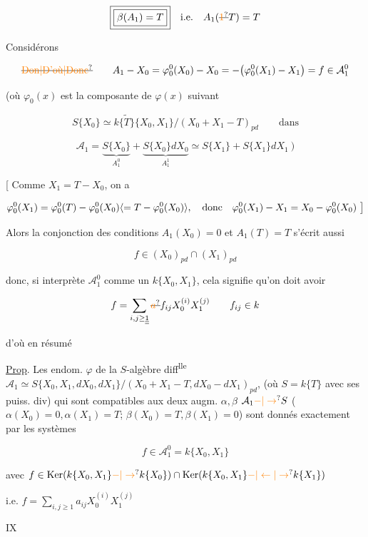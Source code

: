 
\[
\boxed{\boxed{\beta(A_1)=T}}\quad\text{i.e.}\quad A_1(\deleted{\unsure{1}}T)=T
\]

 Considérons

\[
\deleted{\text{\unsure{Don|D'où|Donc}}}\qquad A_1-X_0=\varphi_0^0(X_0)-X_0=-\bigl(\varphi_0^0(X_1)-X_1\bigr)=f\in\mathcal A_1^0
\]

(où $\varphi_0(x)$ est la composante de $\varphi(x)$ suivant

\[
S\{X_0\}\simeq k\widetilde{\{T\}}\{X_0,X_1\}/(X_0+X_1-T)_{pd}\qquad\text{dans}
\]

\[
\mathcal A_1=\underbrace{S\{X_0\}}_{A_1^0}+\underbrace{S\{X_0\}dX_0}_{A_1^1}\simeq S\{X_1\}+S\{X_1\}dX_1\ \bigr)
\]

[  Comme $X_1=T-X_0$, on a

\[
\varphi_0^0(X_1)=\varphi_0^0(T)-\varphi_0^0(X_0)\inserted{=T-\varphi_0^0(X_0)},\quad\text{donc}\quad \varphi_0^0(X_1)-X_1=X_0-\varphi_0^0(X_0)\ \bigr]
\]

Alors la conjonction des conditions $A_1(X_0)=0$ et $A_1(T)=T$ s'écrit aussi

\[
 f\in(X_0)_{pd}\cap(X_1)_{pd}
\]

donc, si  interprète $\mathcal A_1^0$ comme un  $k\{X_0,X_1\}$, cela signifie qu'on doit avoir

\[
 f=\sum_{i,j\geq\underline{\underline{1}}}\deleted{\unsure{a}}f_{ij}X_0^{(i)}X_1^{(j)}
 \qquad f_{ij}\in k
\]

d'où en résumé 

\uline{Prop}. Les endom. $\varphi$ de la $S$-algèbre diff\textsuperscript{lle} $\mathcal A_1\simeq S\{X_0,X_1,dX_0,dX_1\}/(X_0+X_1-T,dX_0-dX_1)_{pd}$, (où $S=k\{T\}$ avec ses puiss. div) qui sont compatibles aux deux augm. $\alpha,\beta$ $\mathcal A_1\unsure{-|\to} S$ ($\alpha(X_0)=0,\alpha(X_1)=T$; $\beta(X_0)=T,\beta(X_1)=0$) sont donnés exactement par les systèmes

\[
 f\in\mathcal A_1^0=k\{X_0,X_1\}
\]

avec $f\in\operatorname{Ker}(k\{X_0,X_1\}\unsure{-|\to}k\{X_0\})\cap\operatorname{Ker}(k\{X_0,X_1\}\unsure{-|\leftarrow|\to}k\{X_1\})$

i.e. $\boxed{f=\sum_{i,j\geq1}a_{ij}X_0^{(i)}X_1^{(j)}}$


\hfill IX

